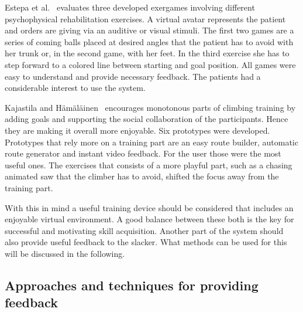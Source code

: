 Estepa et al.~\cite{Estepa2016-oj} evaluates three developed exergames involving different psychophysical rehabilitation exercises. A virtual avatar represents the patient and orders are giving via an auditive or visual stimuli. The first two games are a series of coming balls placed at desired angles that the patient has to avoid with her trunk or, in the second game, with her feet. In the third exercise she has to step forward to a colored line between starting and goal position. All games were easy to understand and provide necessary feedback. The patients had a considerable interest to use the system.

Kajastila and Hämäläinen~\cite{Kajastila2014-ug} encourages monotonous parts of climbing training by adding goals and supporting the social collaboration of the participants. Hence they are making it overall more enjoyable. Six prototypes were developed. Prototypes that rely more on a training part are an easy route builder, automatic route generator and instant video feedback. For the user those were the most useful ones. The exercises that consists of a more playful part, such as a chasing animated saw that the climber has to avoid, shifted the focus away from the training part. 

With this in mind a useful training device should be considered that includes an enjoyable virtual environment. A good balance between these both is the key for successful and motivating skill acquisition. Another part of the system should also provide useful feedback to the slacker. What methods can be used for this will be discussed in the following.

\subsection{Approaches and techniques for providing feedback}\label{2_3_3_feedbackApproachesTechniques}

